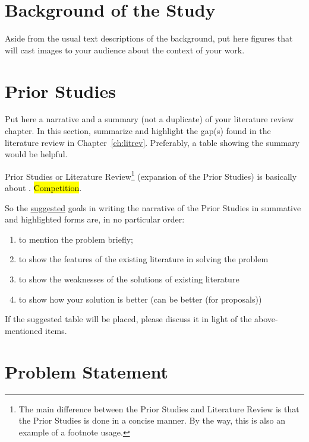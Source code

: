 \section{Background of the Study}

Aside from the usual text descriptions of the background, put here figures that will cast images to your audience about the context of your work.

\graytx{\Blindtext}


\section{Prior Studies}

Put here a narrative and a summary (not a duplicate) of your literature review chapter.  In this section, summarize and highlight the gap(s) found in the literature review in Chapter~\ref{ch:litrev}. Preferably, a table showing the summary would be helpful. 

Prior Studies or Literature Review\footnote{The main difference between the Prior Studies and Literature Review is that the Prior Studies is done in a concise manner.  By the way, this is also an example of a footnote usage.} (expansion of the Prior Studies) is basically about . \hl{Competition}.

So the \underline{suggested} goals in writing the narrative of the Prior Studies in summative and highlighted forms  are, in no particular order:

\begin{enumerate}
	\item to mention the problem briefly; 

	\item to show the features of the existing literature in solving the problem

	\item to show the weaknesses of the solutions of existing literature 

	\item to show how your solution is better (can be better (for proposals))
\end{enumerate}

\noindent If the suggested table will be placed, please discuss it in light of the above-mentioned items. 

 \graytx{\blindtext}


\section{Problem Statement}

